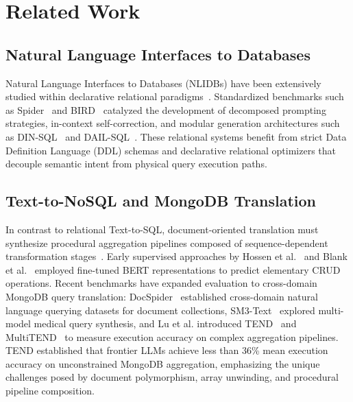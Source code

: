 \section{Related Work}
\label{sec:related}

\subsection{Natural Language Interfaces to Databases}
Natural Language Interfaces to Databases (NLIDBs) have been extensively studied within declarative relational paradigms~\cite{quamar2022nli,ozcan2020nli}. Standardized benchmarks such as Spider~\cite{spider2018} and BIRD~\cite{bird2023} catalyzed the development of decomposed prompting strategies, in-context self-correction, and modular generation architectures such as DIN-SQL~\cite{dinsql2023} and DAIL-SQL~\cite{dailsql2023}. These relational systems benefit from strict Data Definition Language (DDL) schemas and declarative relational optimizers that decouple semantic intent from physical query execution paths.

\subsection{Text-to-NoSQL and MongoDB Translation}
In contrast to relational Text-to-SQL, document-oriented translation must synthesize procedural aggregation pipelines composed of sequence-dependent transformation stages~\cite{mongodb2024manual}. Early supervised approaches by Hossen et al.~\cite{hossen2023bert} and Blank et al.~\cite{blank2019nosql} employed fine-tuned BERT representations to predict elementary CRUD operations. Recent benchmarks have expanded evaluation to cross-domain MongoDB query translation: DocSpider~\cite{docspider2025} established cross-domain natural language querying datasets for document collections, SM3-Text~\cite{sm3text2024} explored multi-model medical query synthesis, and Lu et al. introduced TEND~\cite{tend2025benchmark} and MultiTEND~\cite{multitend2025} to measure execution accuracy on complex aggregation pipelines. TEND established that frontier LLMs achieve less than 36\% mean execution accuracy on unconstrained MongoDB aggregation, emphasizing the unique challenges posed by document polymorphism, array unwinding, and procedural pipeline composition.

